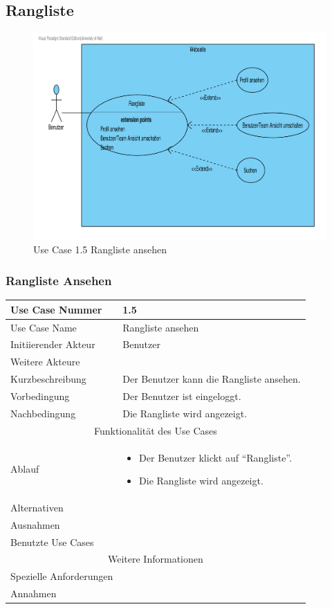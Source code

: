 \documentclass[10pt,a4paper]{article}
\begin{document}
\subsection{Rangliste}
	\begin{figure}[h!]
		\includegraphics[width=\linewidth]{gfx/webseite/rangliste.pdf}
                \caption{Use Case 1.5 Rangliste ansehen}
        \end{figure}

\subsubsection{Rangliste Ansehen}
	\begin{tabular}{|l|p{.5\linewidth}|}
	\hline Use Case Nummer & 1.5 \\ 
	\hline Use Case Name & Rangliste ansehen \\ 
	\hline Initiierender Akteur & Benutzer \\
	\hline Weitere Akteure &  \\
	\hline Kurzbeschreibung & Der Benutzer kann die Rangliste ansehen. \\
	\hline Vorbedingung & Der Benutzer ist eingeloggt. \\
	\hline Nachbedingung & Die Rangliste wird angezeigt. \\
	\hline \multicolumn{2}{|c|}{Funktionalität des Use Cases}\\
	\hline Ablauf & \begin{itemize}
                \item Der Benutzer klickt auf ``Rangliste''. 
                \item Die Rangliste wird angezeigt.
                \end{itemize}\\
	\hline Alternativen & \\
	\hline Ausnahmen &  \\
	\hline Benutzte Use Cases &  \\
	\hline \multicolumn{2}{|c|}{Weitere Informationen} \\
	\hline Spezielle Anforderungen &  \\
	\hline Annahmen &  \\
	\hline
	\end{tabular}
        
\end{document}
